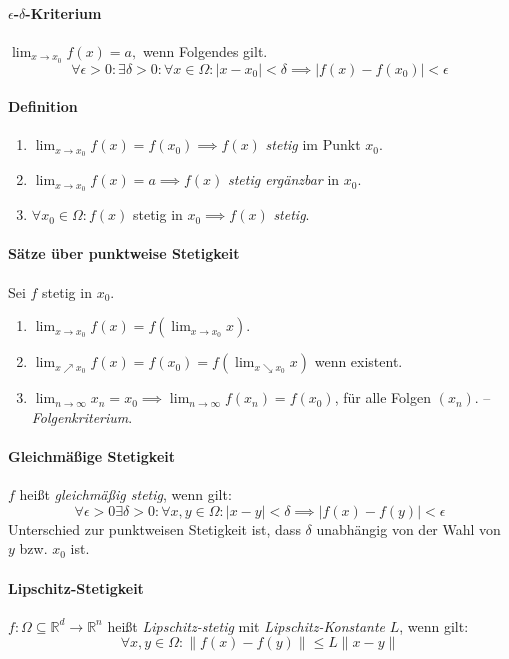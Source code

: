 \documentclass[a4paper, 9pt, DIV=24]{scrartcl}
\newcommand{\R}{\mathbb{R}}
\begin{document}
\paragraph{$\epsilon$-$\delta$-Kriterium} $\lim_{x\to x_0} f(x) = a, $ wenn Folgendes gilt.
\[\forall\epsilon>0:\exists\delta>0: \forall x \in \Omega: |x-x_0| < \delta \implies |f(x) - f(x_0)| < \epsilon \]
\paragraph{Definition}
\begin{enumerate}[label={(}\arabic*{)}]
 \item $\lim_{x\to x_0} f(x) = f(x_0) \implies f(x)$ \emph{stetig} im Punkt $x_0$.
 \item $\lim_{x\to x_0} f(x) = a \implies f(x)$ \emph{stetig ergänzbar} in $x_0$.
 \item $\forall x_0\in\Omega: f(x) $ stetig in $x_0 \implies f(x)$ \emph{stetig}.
\end{enumerate}
 
\paragraph{Sätze über punktweise Stetigkeit}
Sei $f$ stetig in $x_0$.
\begin{enumerate}[label={(}\arabic*{)}]
 \item $\lim_{x\to x_0} f(x) = f(\lim_{x\to x_0} x)$.
 \item $\lim_{x\nearrow x_0} f(x) = f(x_0) = f(\lim_{x\searrow x_0} x)$ wenn existent.
 \item $\lim_{n\to \infty} x_n = x_0 \implies \lim_{n\to \infty} f(x_n) = f(x_0)$, für alle Folgen $(x_n)$. -- \emph{Folgenkriterium}.
\end{enumerate}

\paragraph{Gleichmäßige Stetigkeit}
$f$ heißt \emph{gleichmäßig stetig}, wenn gilt:
\[\forall\epsilon>0\exists\delta>0: \forall x,y \in \Omega: |x-y| < \delta \implies |f(x) - f(y)| < \epsilon \]
Unterschied zur punktweisen Stetigkeit ist, dass $\delta$ unabhängig von der Wahl von $y$ bzw. $x_0$ ist.

\paragraph{Lipschitz-Stetigkeit}
$f: \Omega \subseteq \R^d \rightarrow \R^n$ heißt \emph{Lipschitz-stetig} mit \emph{Lipschitz-Konstante} $L$, wenn gilt:
\[ \forall x,y\in\Omega: \|f(x)-f(y)\| \leq L\|x-y\|\]
\end{document}
